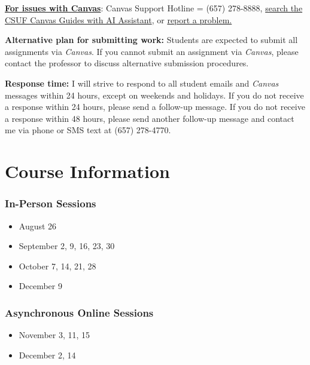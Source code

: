 \documentclass[12pt]{article}     %
\begin{document}
\vspace{0.5em}
\noindent \textbf{\underline{For issues with Canvas}}: Canvas Support Hotline = (657) 278-8888, \href{https://canvashelp.fullerton.edu/}{search the CSUF Canvas Guides with AI Assistant}, or \href{https://titans.service-now.com/sp?id=sc_cat_item&sys_id=f88efe80ebea6a10fb7cfcffcad0cdc6&subject=Canvas}{report a problem.}

\vspace{0.5em}
\noindent \textbf{Alternative plan for submitting work:} Students are expected to submit all assignments via \emph{Canvas}. If you cannot submit an assignment via \emph{Canvas}, please contact the professor to discuss alternative submission procedures.

\vspace{0.5em}
\noindent \textbf{Response time:} I will strive to respond to all student emails and \emph{Canvas} messages within 24 hours, except on weekends and holidays. If you do not receive a response within 24 hours, please send a follow-up message. If you do not receive a response within 48 hours, please send another follow-up message and contact me via phone or SMS text at (657) 278-4770.

\section{Course Information}
    \subsubsection*{In-Person Sessions}
    \begin{itemize}[leftmargin=*]
        \item August 26
        \item September 2, 9, 16, 23, 30
        \item October 7, 14, 21, 28
        \item December 9
    \end{itemize}

    \subsubsection*{Asynchronous Online Sessions}
    \begin{itemize}[leftmargin=*]
        \item November 3, 11, 15
        \item December 2, 14
    \end{itemize}
\end{document}
